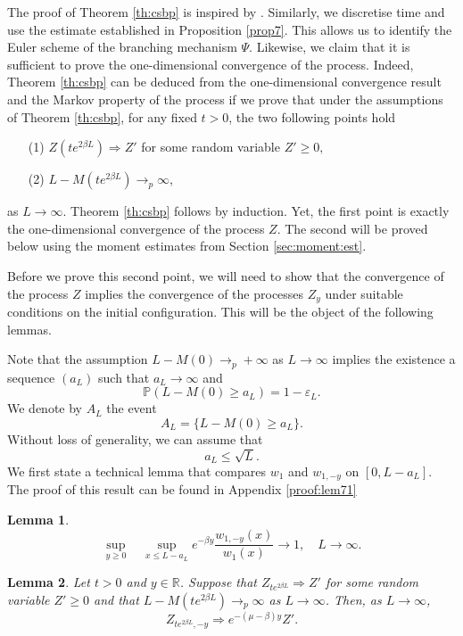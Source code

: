 \documentclass[11pt]{article}
\theoremstyle{plain}
\newtheorem{lemma}{Lemma}[section]
\newcommand\vep{\varepsilon}
\begin{document}
The proof of Theorem \ref{th:csbp} is inspired by \cite[Section 8]{Maillard:2020aa}. Similarly, we discretise time  and use the estimate established in Proposition \ref{prop7}. This allows us to identify the Euler scheme of the branching mechanism $\Psi$. Likewise, we claim that it is sufficient to prove the one-dimensional convergence of the process. Indeed, Theorem \ref{th:csbp} can be deduced from the one-dimensional convergence result and the Markov property of the process if we prove that under the assumptions of Theorem \ref{th:csbp},  for any fixed $t>0$, the two following points hold
\begin{itemize}
\item[(1)] $Z(te^{2\beta L})\Rightarrow Z'$ for some random variable $Z'\geqslant 0,$
\item[(2)]  $L-M(te^{2\beta L})\rightarrow_p \infty$,
\end{itemize}
as $L\to\infty$. Theorem \ref{th:csbp} follows by induction. Yet, the first point is exactly the one-dimensional convergence of the process $Z$. The second will be proved below using the moment estimates from Section \ref{sec:moment:est}.

Before we prove this second point, we will need to show that the convergence of the process $Z$ implies the convergence of the processes $Z_y$ under suitable conditions on the initial configuration. This will be the object of the following lemmas. 

Note that the assumption $L-M(0)\to_p+\infty$ as $L\to\infty$ implies the existence a sequence $(a_L)$ such that $a_L\to \infty$ and \begin{equation}
\mathbb{P}(L-M(0)\geqslant a_L)=1-\vep_L \label{p_AL}.
\end{equation}
We denote by $A_L$ the event 
\begin{equation*}
A_L=\{L-M(0)\geqslant a_L\}.
\end{equation*}
Without loss of generality, we can assume that 
\begin{equation}
a_L\leqslant \sqrt{L}.\label{hyp:aL}
\end{equation}
We first state a technical lemma that compares $w_1$ and $w_{1,-y}$ on $[0,L-a_L]$. The proof of this result can be found in Appendix \ref{proof:lem71} 
\begin{lemma}\label{est:wy}
\begin{equation*}
\sup_{y\geqslant 0} \quad \sup_{x\leqslant L-a_L}e^{-\beta y}\frac{w_{1,-y}(x)}{w_1(x)}\to 1, \quad L\to\infty.
\end{equation*}
\end{lemma}
\begin{lemma}\label{lem:CVZ}
Let $t>0$ and $y\in\mathbb{R}$. Suppose  that $Z_{te^{2\beta L}}\Rightarrow Z'$ for some random variable $Z'\geqslant 0$ and that  $L-M(te^{2\beta L})\to_p\infty$ as $L\to\infty$. Then, as $L\to \infty$,
\begin{equation*}
Z_{te^{2\beta L},-y}\Rightarrow e^{-(\mu-\beta)y}Z'.
\end{equation*}
\end{lemma}
\end{document}
